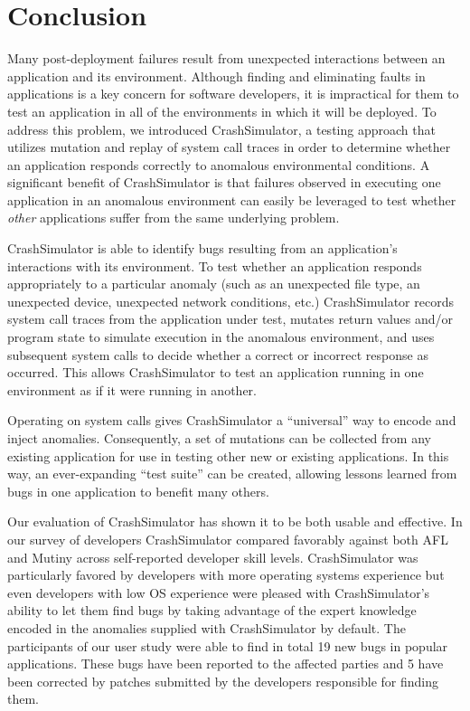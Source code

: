 \section{Conclusion}
\label{SEC:conclusion}

Many post-deployment failures result from unexpected interactions between
an application and its environment.  Although finding and eliminating
faults in applications is a key concern for software developers, it is
impractical for them to test an application in all of the environments in
which it will be deployed.  To address this problem, we introduced
CrashSimulator, a testing approach that utilizes mutation and replay
of system call traces in order to determine whether an application
responds correctly to anomalous environmental conditions.
A significant
benefit of CrashSimulator is that failures observed in executing one
application in an anomalous environment can easily be leveraged to test
whether {\em other} applications suffer from the same underlying problem.

CrashSimulator is able to identify
bugs resulting from an
application's interactions with its environment.  To test whether an
application responds appropriately to a particular anomaly (such as an
unexpected file type, an unexpected device, unexpected network conditions,
etc.) CrashSimulator records system call traces from the application under
test, mutates return values and/or program state to simulate execution in
the anomalous environment, and uses subsequent
system calls to decide whether a correct or incorrect response as occurred.
This allows
CrashSimulator to test an application running in one environment as if it
were running in another.


Operating on system calls gives CrashSimulator a ``universal'' way to
encode and inject anomalies.
Consequently, a set of
mutations can be collected from any existing application for
use in testing other new or existing applications.  In this way, an
ever-expanding ``test suite'' can be created, allowing lessons learned from
bugs in one application to benefit many others.

Our evaluation of CrashSimulator has shown it to be both usable and
effective.  In our survey of developers CrashSimulator compared favorably
against both AFL and Mutiny across self-reported developer skill levels.
CrashSimulator was particularly favored by developers with more operating
systems experience but even developers with low OS experience were pleased
with CrashSimulator's ability to let them find bugs by taking advantage of
the expert knowledge encoded in the anomalies supplied with CrashSimulator
by default.  The participants of our user study were able to find in total
19 new bugs in popular applications.  These bugs have been reported to the
affected parties and 5 have been corrected by patches submitted by the
developers responsible for finding them.

